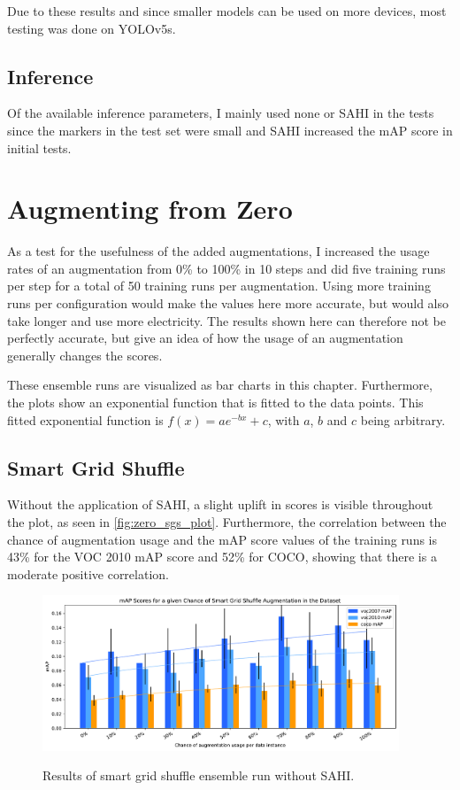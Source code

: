 \documentclass[10pt]{book}
\newcommand{\figureref}[1]{\autoref{#1}}
\begin{document}
Due to these results and since smaller models can be used on more devices, most testing was done on \ac{YOLO}v5s.

\subsection{Inference}

Of the available inference parameters, I mainly used none or \ac{SAHI} in the tests since the markers in the test set were small and \ac{SAHI} increased the \ac{mAP} score in initial tests.

\section{Augmenting from Zero} %
\label{sec:aug_ens_zero}

As a test for the usefulness of the added augmentations, I increased the usage rates of an augmentation from 0\% to 100\% in 10 steps and did five training runs per step for a total of 50 training runs per augmentation. Using more training runs per configuration would make the values here more accurate, but would also take longer and use more electricity. The results shown here can therefore not be perfectly accurate, but give an idea of how the usage of an augmentation generally changes the scores. 

These ensemble runs are visualized as bar charts in this chapter. Furthermore, the plots show an exponential function that is fitted to the data points. This fitted exponential function is $f(x)=a\mathit{e}^{-bx}+c$, with $a$, $b$ and $c$ being arbitrary.

\subsection{Smart Grid Shuffle}

Without the application of \ac{SAHI}, a slight uplift in scores is visible throughout the plot, as seen in \figureref{fig:zero_sgs_plot}. Furthermore, the correlation between the chance of augmentation usage and the \ac{mAP} score values of the training runs is 43\% for the VOC 2010 \ac{mAP} score and 52\% for \ac{COCO}, showing that there is a moderate positive correlation.

\begin{figure}
  \caption{Results of smart grid shuffle ensemble run without \ac{SAHI}.}
  \includegraphics[width=0.95\textwidth]{image/zero-based-sgs-ensemble-2-thesis-2}
  \label{fig:zero_sgs_plot}
\end{figure}
\end{document}
